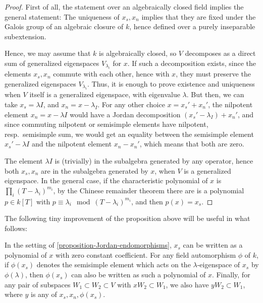 \begin{proof}
 First of all, the statement over an algebraically closed field implies the general statement: The uniqueness of $x_s, x_n$ implies that they are fixed under the Galois group of an algebraic closure of $k$, hence defined over a purely inseparable subextension.
 
 Hence, we may assume that $k$ is algebraically closed, so $V$ decomposes as a direct sum of generalized eigenspaces $V_{\lambda_i}$ for $x$. If such a decomposition exists, since the elements $x_s, x_n$ commute with each other, hence with $x$, they must preserve the generalized eigenspaces $V_{\lambda_i}$. Thus, it is enough to prove existence and uniqueness when $V$ itself is a generalized eigenspace, with eigenvalue $\lambda$. But then, we can take $x_s=\lambda I$, and $x_n = x - \lambda_I$. For any other choice $x=x_s'+x_n'$, the nilpotent element $x_n=x-\lambda I$ would have a Jordan decomposition $(x_s'-\lambda_I) + x_n'$, and since commuting nilpotent or semisimple elements have nilpotent, resp.\ semisimple sum, we would get an equality between the semisimple element $x_s'-\lambda I$ and the nilpotent element $x_n-x_n'$, which means that both are zero.
 
 The element $\lambda I$ is (trivially) in the subalgebra generated by any operator, hence both $x_s, x_n$ are in the subalgebra generated by $x$, when $V$ is a generalized eigenspace. In the general case, if the characteristic polynomial of $x$ is $\prod_i (T-\lambda_i)^{m_i}$, by the Chinese remainder theorem there are is a polynomial $p\in k[T]$ with $p\equiv \lambda_i \mod (T-\lambda_i)^{m_i}$, and then $p(x)=x_s$. 
\end{proof}

The following tiny improvement of the proposition above will be useful in what follows:

\begin{lemma}
\label{lemma-Jordan-extension}
In the setting of \ref{proposition-Jordan-endomorphisms}, $x_s$ can be written as a polynomial of $x$ with zero constant coefficient. For any field automorphism $\phi$ of $k$, if $\phi(x_s)$ denotes the semisimple element which acts on the $\lambda$-eigenspace of $x_s$ by $\phi(\lambda)$, then $\phi(x_s)$ can also be written as such a polynomial of $x$. Finally, for any pair of subspaces $W_1\subset W_2\subset V$ with $xW_2\subset W_1$, we also have $yW_2\subset W_1$, where $y$ is any of $x_s, x_n, \phi(x_s)$.
\end{lemma}

